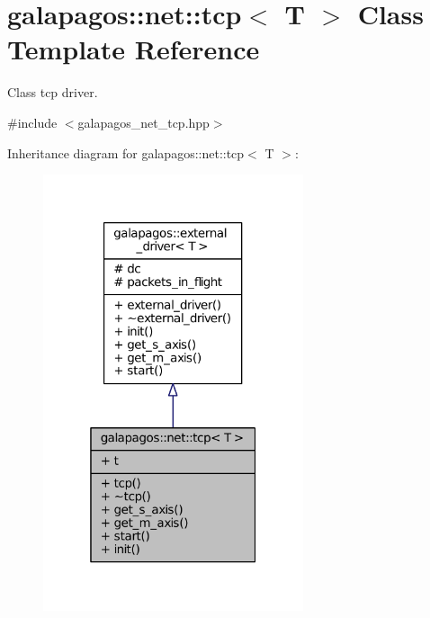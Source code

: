 \hypertarget{classgalapagos_1_1net_1_1tcp}{}\section{galapagos\+:\+:net\+:\+:tcp$<$ T $>$ Class Template Reference}
\label{classgalapagos_1_1net_1_1tcp}


Class tcp driver.  




{\ttfamily \#include $<$galapagos\+\_\+net\+\_\+tcp.\+hpp$>$}



Inheritance diagram for galapagos\+:\+:net\+:\+:tcp$<$ T $>$\+:
\nopagebreak
\begin{figure}[H]
\begin{center}
\leavevmode
\includegraphics[width=217pt]{classgalapagos_1_1net_1_1tcp__inherit__graph}
\end{center}
\end{figure}


